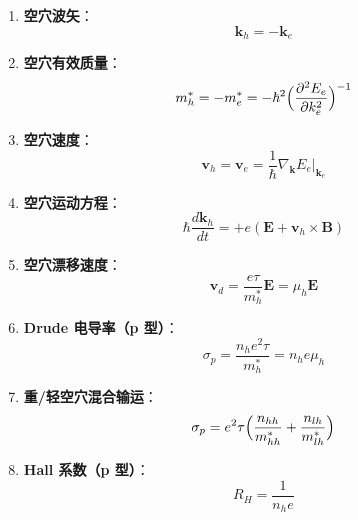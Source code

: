 \begin{formulabox}[核心公式]
\begin{enumerate}[label=\textbf{(\arabic*)}]
    \item \textbf{空穴波矢}：
    \[
    \mathbf{k}_h=-\mathbf{k}_e
    \]

    \item \textbf{空穴有效质量}：
    \[
    m_h^*=-m_e^*=-\hbar^2\Bigl(\frac{\partial^2E_e}{\partial k_e^2}\Bigr)^{-1}
    \]

    \item \textbf{空穴速度}：
    \[
    \mathbf{v}_h=\mathbf{v}_e=\frac{1}{\hbar}\nabla_{\mathbf{k}}E_e\big|_{\mathbf{k}_e}
    \]

    \item \textbf{空穴运动方程}：
    \[
    \hbar\frac{d\mathbf{k}_h}{dt}=+e(\mathbf{E}+\mathbf{v}_h\times\mathbf{B})
    \]

    \item \textbf{空穴漂移速度}：
    \[
    \mathbf{v}_d=\frac{e\tau}{m_h^*}\mathbf{E}=\mu_h\mathbf{E}
    \]

    \item \textbf{Drude 电导率（p 型）}：
    \[
    \sigma_p=\frac{n_h e^2\tau}{m_h^*}=n_h e\mu_h
    \]

    \item \textbf{重/轻空穴混合输运}：
    \[
    \sigma_p=e^2\tau\Bigl(\frac{n_{hh}}{m_{hh}^*}+\frac{n_{lh}}{m_{lh}^*}\Bigr)
    \]

    \item \textbf{Hall 系数（p 型）}：
    \[
    R_H=\frac{1}{n_h e}
    \]
\end{enumerate}
\end{formulabox}

